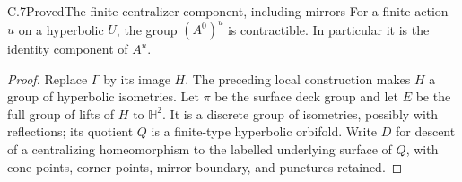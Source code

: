 \begin{claim}{C.7}{Proved}{The finite centralizer component, including mirrors}
For a finite action $u$ on a hyperbolic $U$, the group $(A^0)^u$ is
contractible. In particular it is the identity component of $A^u$.
\end{claim}
\begin{proof}
Replace $\Gamma$ by its image $H$. The preceding local construction
makes $H$ a group of hyperbolic isometries. Let $\pi$ be the surface deck
group and let $E$ be the full group of lifts of $H$ to $\mathbb H^2$.
It is a discrete group of isometries, possibly with reflections; its
quotient $Q$ is a finite-type hyperbolic orbifold. Write $D$ for descent
of a centralizing homeomorphism to the labelled underlying surface of
$Q$, with cone points, corner points, mirror boundary, and punctures
retained.


\end{proof}
